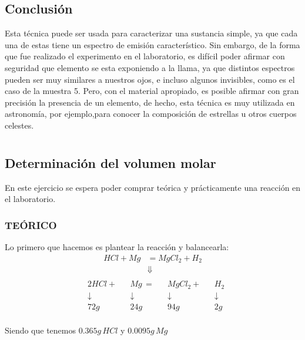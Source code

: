 \documentclass[12pt]{report}
\begin{document}
\section{Conclusión}

Esta técnica puede ser usada para caracterizar una sustancia simple, ya que cada una de estas tiene
un espectro de emisión característico. Sin embargo, de la forma que fue realizado el experimento en
el laboratorio, es difícil poder afirmar con seguridad que elemento se esta exponiendo a la llama,
ya que distintos espectros pueden ser muy similares a nuestros ojos, e incluso algunos invisibles,
como es el caso de la muestra 5. Pero, con el material apropiado, es posible afirmar con
gran precisión la presencia de un elemento, de hecho, esta técnica es muy utilizada en astronomía,
por ejemplo,para conocer la composición de estrellas u otros cuerpos celestes.

\chapter{}
\section{Determinación del volumen molar}

En este ejercicio se espera poder comprar teórica y prácticamente una reacción en el laboratorio.\\

\subsection{TEÓRICO}

Lo primero que hacemos es plantear la reacción y balancearla:\\
$$
\begin{aligned}
    HCl + Mg &= MgCl_2 + H_2\\[6pt]
    &\Downarrow\\[6pt]
\end{aligned}
$$
$$
\begin{aligned}
    &2HCl + &&Mg \, = &&MgCl_2 + &&H_2 \\[6pt]
    &\downarrow &&\downarrow &&\downarrow &&\downarrow \\
    &72g &&24g &&94g &&2g \\[12pt]
\end{aligned}
$$

Siendo que tenemos $0.365g \, HCl$ y $0.0095g \, Mg$\\
\end{document}
